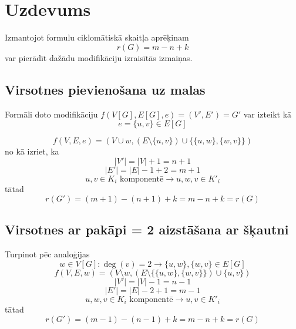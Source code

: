 \documentclass[12pt, a4paper]{article}
\begin{document}
\newpage
\section{Uzdevums}

Izmantojot formulu ciklomātiskā skaitļa aprēķinam
\begin{equation}
    r(G) = m-n+k
\end{equation}
var pierādīt dažādu modifikāciju izraisītās izmaiņas.

\subsection{Virsotnes pievienošana uz malas}
Formāli doto modifikāciju $f(V[G], E[G], e)=(V',E')=G'$ var izteikt kā
\begin{equation}
    e= \lbrace u,v \rbrace \in E[G]
\end{equation}

\begin{equation}
    f(V,E,e) = (V \cup w, (E \setminus \lbrace u,v \rbrace) \cup \lbrace
    \lbrace u,w \rbrace, \lbrace w,v \rbrace 
    \rbrace)
\end{equation}
no kā izriet, ka
\begin{equation}
    \vert V' \vert = \vert V \vert + 1 = n + 1
\end{equation}
\begin{equation}
    \vert E' \vert = \vert E \vert -1 + 2 = m + 1
\end{equation}
\begin{equation}
    u,v \in K_i \text{ komponentē} \rightarrow u,w,v \in K'_i
\end{equation}
tātad
\begin{equation}
    r(G') = (m+1)-(n+1)+k = m-n+k = r(G)
\end{equation}


\subsection{Virsotnes ar pakāpi = 2 aizstāšana ar šķautni}
Turpinot pēc analoģijas
\begin{equation}
    w \in V[G] : \deg(v) = 2 \rightarrow \lbrace u,w \rbrace, \lbrace w,v \rbrace \in E[G]
\end{equation}
\begin{equation}
    f(V,E,w) = (V \setminus w, (E \setminus \lbrace \lbrace u,w \rbrace, \lbrace w,v\rbrace  \rbrace) \cup \lbrace u,v \rbrace)
\end{equation}
\begin{equation}
    \vert V' \vert = \vert V \vert - 1 = n - 1
\end{equation}
\begin{equation}
    \vert E' \vert = \vert E \vert - 2 + 1 = m - 1
\end{equation}
\begin{equation}
    u,w,v \in K_i \text{ komponentē} \rightarrow u,v \in K'_i
\end{equation}
tātad
\begin{equation}
    r(G') = (m-1)-(n-1)+k = m-n+k = r(G)
\end{equation}
\end{document}
